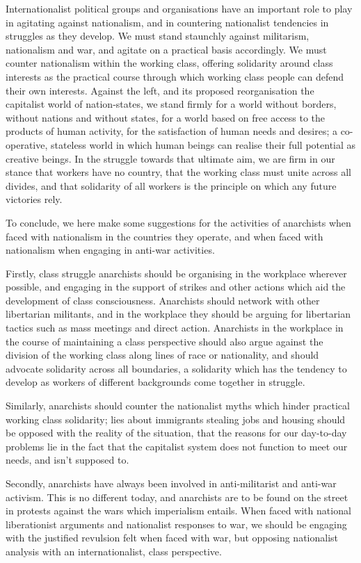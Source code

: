 Internationalist political groups and organisations have an important role to play in agitating against nationalism, and in countering nationalist tendencies in struggles as they develop. We must stand staunchly against militarism, nationalism and war, and agitate on a practical basis accordingly. We must counter nationalism within the working class, offering solidarity around class interests as the practical course through which working class people can defend their own interests. Against the left, and its proposed reorganisation the capitalist world of nation-states, we stand firmly for a world without borders, without nations and without states, for a world based on free access to the products of human activity, for the satisfaction of human needs and desires; a co-operative, stateless world in which human beings can realise their full potential as creative beings. In the struggle towards that ultimate aim, we are firm in our stance that workers have no country, that the working class must unite across all divides, and that solidarity of all workers is the principle on which any future victories rely.

To conclude, we here make some suggestions for the activities of anarchists when faced with nationalism in the countries they operate, and when faced with nationalism when engaging in anti-war activities.

Firstly, class struggle anarchists should be organising in the workplace wherever possible, and engaging in the support of strikes and other actions which aid the development of class consciousness. Anarchists should network with other libertarian militants, and in the workplace they should be arguing for libertarian tactics such as mass meetings and direct action. Anarchists in the workplace in the course of maintaining a class perspective should also argue against the division of the working class along lines of race or nationality, and should advocate solidarity across all boundaries, a solidarity which has the tendency to develop as workers of different backgrounds come together in struggle.

Similarly, anarchists should counter the nationalist myths which hinder practical working class solidarity; lies about immigrants stealing jobs and housing should be opposed with the reality of the situation, that the reasons for our day-to-day problems lie in the fact that the capitalist system does not function to meet our needs, and isn’t supposed to.

Secondly, anarchists have always been involved in anti-militarist and anti-war activism. This is no different today, and anarchists are to be found on the street in protests against the wars which imperialism entails. When faced with national liberationist arguments and nationalist responses to war, we should be engaging with the justified revulsion felt when faced with war, but opposing nationalist analysis with an internationalist, class perspective.


